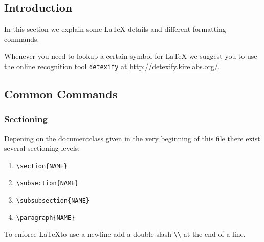 \documentclass[10pt,a4paper]{scrartcl}
\begin{document}
\subsection{Introduction} 

In this section we explain some \LaTeX\xspace details and different formatting
commands.

Whenever you need to lookup a certain symbol for \LaTeX\xspace we suggest you to use
the online recognition tool \texttt{detexify} at \url{http://detexify.kirelabs.org/}.


\subsection{Common Commands}
\subsubsection{Sectioning}
Depening on the documentclass given in the very beginning of this file there
exist several sectioning levels:
\begin{enumerate}
	\item{} \verb$\section{NAME}$
	\item{} \verb$\subsection{NAME}$
	\item{} \verb$\subsubsection{NAME}$
	\item{} \verb$\paragraph{NAME}$
\end{enumerate}

\noindent To enforce \LaTeX to use a newline add a double slash \verb$\\$ at 
the end of a line.
\end{document}
